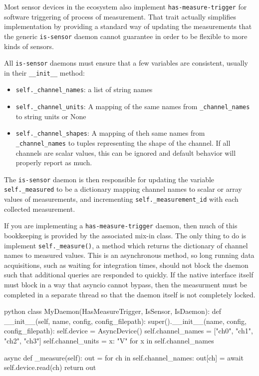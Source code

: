 Most sensor devices in the \yaq{} ecosystem also implement \texttt{has-measure-trigger} for software triggering of process of measurement.
That trait actually simplifies implementation by providing a standard way of updating the measurements that the generic \texttt{is-sensor} daemon cannot guarantee in order to be flexible to more kinds of sensors.

All \texttt{is-sensor} daemons must ensure that a few variables are consistent, usually in their \texttt{\_\_init\_\_} method:

\begin{itemize}
\item \texttt{self.\_channel\_names}: a list of string names
\item \texttt{self.\_channel\_units}: A mapping of the same names from \texttt{\_channel\_names} to string units or None
\item \texttt{self.\_channel\_shapes}: A mapping of theh same names from \texttt{\_channel\_names} to tuples representing the shape of the channel. If all channels are scalar values, this can be ignored and default behavior will properly report as much.
\end{itemize}

The \texttt{is-sensor} daemon is then responsible for updating the variable \texttt{self.\_measured} to be a dictionary mapping channel names to scalar or array values of measurements, and incrementing \texttt{self.\_measurement\_id} with each collected measurement.

If you are implementing a \texttt{has-measure-trigger} daemon, then much of this bookkeeping is provided by the associated mix-in class.
The only thing to do is implement \texttt{self.\_measure()}, a method which returns the dictionary of channel names to measured values.
This is an asynchronous method, so long running data acquisitions, such as waiting for integration times, should not block the daemon such that additional queries are responded to quickly.
If the native interface itself must block in a way that asyncio cannot bypass, then the measurment must be completed in a separate thread so that the daemon itself is not completely locked.

\begin{codefragment}{python}
class MyDaemon(HasMeasureTrigger, IsSensor, IsDaemon):
    def __init__(self, name, config, config_filepath):
        super().__init__(name, config, config_filepath):
        self.device = AsyncDevice()
        self.channel_names = ["ch0", "ch1", "ch2", "ch3"]
        self.channel_units = {x: "V" for x in self.channel_names}

    async def _measure(self):
        out = {}
        for ch in self.channel_names:
            out[ch] = await self.device.read(ch)
        return out
\end{codefragment}

